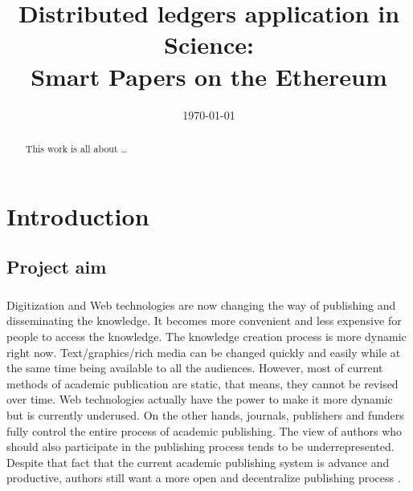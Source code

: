 \documentclass{ecsthesis}      %
\begin{document}
\frontmatter
\title      {Distributed ledgers application in Science: \\
Smart Papers on the Ethereum}



\addresses  {\deptname\\\univname}
\date       {\today}
			
\subject    {}
\keywords   {}
\maketitle
\begin{abstract}
This work is all about \dots
\end{abstract}
\tableofcontents
\listoffigures
\listoftables
\mainmatter
\chapter{Introduction}
\section{Project aim}
\paragraph{}Digitization and Web technologies are now changing the way of publishing and disseminating the knowledge.
It becomes more convenient and less expensive for people to access the knowledge. 
The knowledge creation process is more dynamic right now. 
Text/graphics/rich media can be changed quickly and easily while at the same time being available to all the audiences.
However, most of current methods of academic publication are static, that means, they cannot be revised over time\cite{heller2014dynamic}. 
Web technologies actually have the power to make it more dynamic but is currently underused. On the other hands, journals, publishers and funders fully control
the entire process of academic publishing. The view of authors who should also participate in the publishing process tends to be underrepresented. 
Despite that fact that the current academic publishing system is advance and productive, 
authors still want a more open and decentralize publishing process \cite{d2018authors}.
\end{document}
